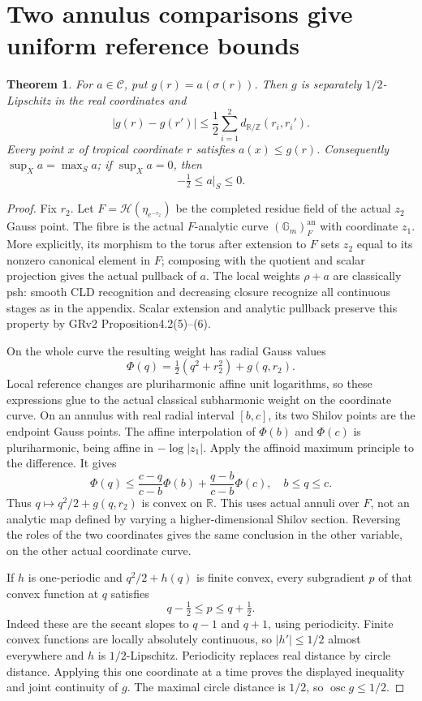 \documentclass[11pt]{article}
\newcommand{\C}{\mathcal C}
\newcommand{\RR}{\mathbb R}
\newtheorem{theorem}{Theorem}
\theoremstyle{remark}\newtheorem{remark}[theorem]{Remark}
\begin{document}
\section{Two annulus comparisons give uniform reference bounds}
\begin{theorem}\label{gauss}
For $a\in\C$, put $g(r)=a(\sigma(r))$. Then $g$ is separately
$1/2$-Lipschitz in the real coordinates and
\[
 |g(r)-g(r')|\le\frac12\sum_{i=1}^2
      d_{\RR/\mathbb Z}(r_i,r_i').
\]
Every point $x$ of tropical coordinate $r$ satisfies $a(x)\le g(r)$.
Consequently $\sup_Xa=\max_Sa$; if $\sup_Xa=0$, then
\begin{equation}\label{refbound}
 -\tfrac12\le a|_S\le0.
\end{equation}
\end{theorem}
\begin{proof}
Fix $r_2$. Let $F=\mathscr H(\eta_{e^{-r_2}})$ be the completed
residue field of the actual $z_2$ Gauss point. The fibre is the
actual $F$-analytic curve $(\mathbb G_m)^{\mathrm{an}}_F$ with
coordinate $z_1$. More explicitly, its morphism to the torus
after extension to $F$ sets $z_2$ equal to its nonzero canonical
element in $F$; composing with the quotient and scalar projection
gives the actual pullback of $a$. The local weights $\rho+a$ are
classically psh: smooth CLD recognition and decreasing closure
recognize all continuous stages as in the appendix. Scalar
extension and analytic pullback preserve this property by GRv2
Proposition4.2(5)--(6).

On the whole curve the resulting weight has radial Gauss values
\[
 \Phi(q)=\tfrac12(q^2+r_2^2)+g(q,r_2).
\]
Local reference changes are pluriharmonic affine unit logarithms,
so these expressions glue to the actual classical subharmonic
weight on the coordinate curve. On an annulus with real radial
interval $[b,c]$, its two Shilov points are the endpoint Gauss
points. The affine interpolation of $\Phi(b)$ and $\Phi(c)$ is
pluriharmonic, being affine in $-\log|z_1|$. Apply the affinoid
maximum principle to the difference. It gives
\[
 \Phi(q)\le\frac{c-q}{c-b}\Phi(b)+
                 \frac{q-b}{c-b}\Phi(c),\quad b\le q\le c.
\]
Thus $q\mapsto q^2/2+g(q,r_2)$ is convex on $\RR$.
This uses actual annuli over $F$, not an analytic map defined by
varying a higher-dimensional Shilov section. Reversing the roles
of the two coordinates gives the same conclusion in the other
variable, on the other actual coordinate curve.

If $h$ is one-periodic and $q^2/2+h(q)$ is finite convex, every
subgradient $p$ of that convex function at $q$ satisfies
\[
 q-\tfrac12\le p\le q+\tfrac12.
\]
Indeed these are the secant slopes to $q-1$ and $q+1$, using
periodicity. Finite convex functions are locally absolutely
continuous, so $|h'|\le1/2$ almost everywhere and $h$ is
$1/2$-Lipschitz. Periodicity replaces real distance by circle
distance. Applying this one coordinate at a time proves the
displayed inequality and joint continuity of $g$. The maximal
circle distance is $1/2$, so $\operatorname{osc}g\le1/2$.


\end{proof}
\end{document}
